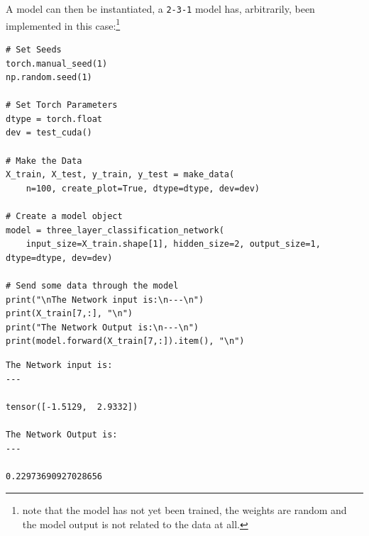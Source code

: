 \documentclass[a4paper,11pt,twoside]{article}
\begin{document}
A model can then be instantiated, a \texttt{2-3-1}
model has, arbitrarily, been implemented in this case:\footnote{note that the model has not yet been trained, the weights are
random and the model output is not related to the data at all.}

\begin{verbatim}
# Set Seeds
torch.manual_seed(1)
np.random.seed(1)

# Set Torch Parameters
dtype = torch.float
dev = test_cuda()

# Make the Data
X_train, X_test, y_train, y_test = make_data(
    n=100, create_plot=True, dtype=dtype, dev=dev)

# Create a model object
model = three_layer_classification_network(
    input_size=X_train.shape[1], hidden_size=2, output_size=1, dtype=dtype, dev=dev)

# Send some data through the model
print("\nThe Network input is:\n---\n")
print(X_train[7,:], "\n")
print("The Network Output is:\n---\n")
print(model.forward(X_train[7,:]).item(), "\n")

\end{verbatim}

\begin{verbatim}
The Network input is:
---

tensor([-1.5129,  2.9332]) 

The Network Output is:
---

0.22973690927028656 
\end{verbatim}
\end{document}
